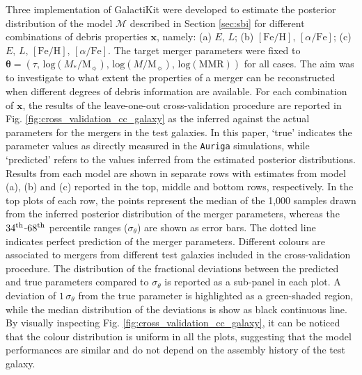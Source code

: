 Three implementation of GalactiKit were developed to estimate the posterior distribution of the model $\mathcal{M}$ described in Section \ref{sec:sbi} for different combinations of debris properties $\bm{x}$, namely: (a) $E, \,L$; (b) $[\text{Fe}/\text{H}], \, [\alpha/\text{Fe}]$; (c) $E, \, L, \, [\text{Fe}/\text{H}], \, [\alpha/\text{Fe}]$. The target merger parameters  were fixed to $\bm{\theta} = (\tau, \, \mathrm{log}(M_{*}/\mathrm{M}_{\sun}), \, \mathrm{log}(M/\mathrm{M}_{\sun}), \, \mathrm{log}(\text{MMR}))$ for all cases. The aim was to investigate to what extent the properties of a merger can be reconstructed when different degrees of debris information are available. 
For each combination of $\bm{x}$, the results of the leave-one-out cross-validation procedure are reported in Fig. \ref{fig:cross_validation_cc_galaxy} as the inferred against the actual parameters for the mergers in the test galaxies. In this paper, `true' indicates the parameter values as directly measured in the \texttt{Auriga} simulations, while `predicted' refers to the values inferred from the estimated posterior distributions. Results from each model are shown in separate rows with estimates from model (a), (b) and (c) reported in the top, middle and bottom rows, respectively. In the top plots of each row, the points represent the median of the 1,000 samples drawn from the inferred posterior distribution of the merger parameters, whereas the $34^{\rm th}$-$68^{\rm th}$ percentile ranges ($\sigma_{\theta}$) are shown as error bars. The dotted line indicates perfect prediction of the merger parameters.  Different colours are associated to mergers from different test galaxies included in the cross-validation procedure.  The distribution of the fractional deviations between the predicted and true parameters compared to $\sigma_{\theta}$ is reported as a sub-panel in each plot. A deviation of $1\,\sigma_{\theta}$ from the true parameter is highlighted as a green-shaded region, while the median distribution of the deviations is show as black continuous line.     By visually inspecting Fig. \ref{fig:cross_validation_cc_galaxy}, it can be noticed that the colour distribution is uniform in all the plots, suggesting that the model performances are similar and do not depend on the assembly history of the test galaxy.


